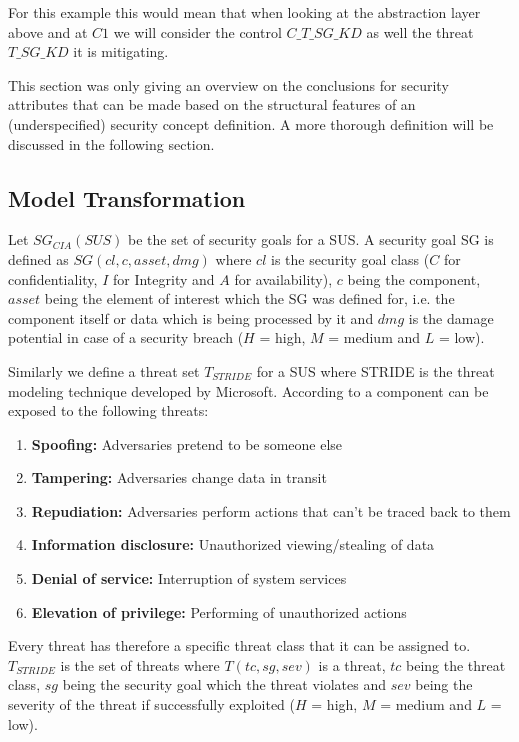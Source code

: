 For this example this would mean that when looking at the abstraction layer above and at $C1$ we will consider the control $C\_T\_SG\_KD$ as well the threat $T\_SG\_KD$ it is mitigating.

This section was only giving an overview on the conclusions for security attributes that can be made based on the structural features of an (underspecified) security concept definition. A more thorough definition will be discussed in the following section. 

\subsection{Model Transformation}

Let $SG_{CIA}(SUS)$ be the set of security goals for a SUS. A security goal SG is defined as $SG(cl, c, asset, dmg)$ where $cl$ is the security goal class ($C$ for confidentiality, $I$ for Integrity and $A$ for availability), $c$ being the component, $asset$ being the element of interest which the SG was defined for, i.e. the component itself or data which is being processed by it and $dmg$ is the damage potential in case of a security breach ($H$ = high, $M$ = medium and $L$ = low).

Similarly we define a threat set $T_{STRIDE}$ for a SUS where STRIDE is the threat modeling technique developed by Microsoft. According to \cite{torr} a component can be exposed to the following threats:

\begin{enumerate}
\item[]\textbf{Spoofing:} Adversaries pretend to be someone else
\item[]\textbf{Tampering:} Adversaries change data in transit
\item[]\textbf{Repudiation:} Adversaries perform actions that can't be traced back to them
\item[]\textbf{Information disclosure:} Unauthorized viewing/stealing of data
\item[]\textbf{Denial of service:} Interruption of system services
\item[]\textbf{Elevation of privilege:} Performing of unauthorized actions
\end{enumerate}

Every threat has therefore a specific threat class that it can be assigned to. $T_{STRIDE}$ is the set of threats where $T(tc, sg, sev)$ is a threat, $tc$ being the threat class, $sg$ being the security goal which the threat violates and $sev$ being the severity of the threat if successfully exploited ($H$ = high, $M$ = medium and $L$ = low). 

